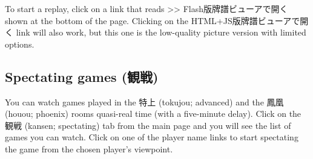 \bigskip
To start a replay, click on a link that reads >> Flash版牌譜ビューアで開く shown at the bottom of the page. Clicking on the HTML+JS版牌譜ビューアで開く link will also work, but this one is the low-quality picture version with limited options.

\subsection{Spectating games (観戦)}
You can watch games played in the 特上 ({\jap tokujou}; advanced) and the 鳳凰 ({\jap houou}; phoenix) rooms quasi-real time (with a five-minute delay). Click on the 観戦 ({\jap kansen}; spectating) tab from the main page and you will see the list of games you can watch. Click on one of the player name links to start spectating the game from the chosen player's viewpoint.

